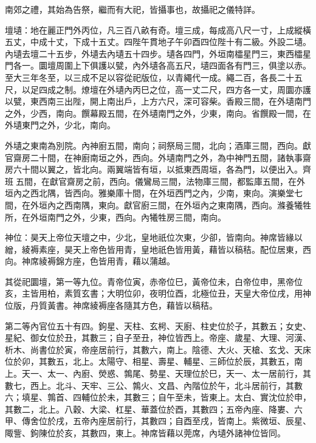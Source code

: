 \begin{pinyinscope}
 南郊之禮，其始為告祭，繼而有大祀，皆攝事也，故攝祀之儀特詳。



 壇壝：地在麗正門外丙位，凡三百八畝有奇。壇三成，每成高八尺一寸，上成縱橫五丈，中成十丈，下成十五丈。四陛午貫地子午卯酉四位陛十有二級。外設二壝。內壝去壇二十五步，外壝去內壝五十四步。壝各四門，外垣南櫺星門三，東西櫺星門各一。圜壇周圍上下俱護以甓，內外壝各高五尺，壝四面各有門三，俱塗以赤。至大三年冬至，以三成不足以容從祀版位，以青繩代一成。繩二百，各長二十五尺，以足四成之制。燎壇在外壝內丙巳之位，高一丈二尺，四方各一丈，周圜亦護以甓，東西南三出陛，開上南出戶，上方六尺，深可容柴。香殿三間，在外壝南門之外，少西，南向。饌幕殿五間，在外壝南門之外，少東，南向。省饌殿一間，在外壝東門之外，少北，南向。



 外壝之東南為別院。內神廚五間，南向；祠祭局三間，北向；酒庫三間，西向。獻官齋房二十間，在神廚南垣之外，西向。外壝南門之外，為中神門五間，諸執事齋房六十間以翼之，皆北向。兩翼端皆有垣，以抵東西周垣，各為門，以便出入。齊班五間，在獻官齋房之前，西向。儀鸞局三間，法物庫三間，都監庫五間，在外垣內之西北隅，皆西向。雅樂庫十間，在外垣西門之內，少南，東向。演樂堂七間，在外垣內之西南隅，東向。獻官廚三間，在外垣內之東南隅，西向。滌養犧牲所，在外垣南門之外，少東，西向。內犧牲房三間，南向。



 神位：昊天上帝位天壇之中，少北，皇地祇位次東，少卻，皆南向。神席皆緣以繒，綾褥素座，昊天上帝色皆用青，皇地祇色皆用黃，藉皆以稿秸。配位居東，西向。神席綾褥錦方座，色皆用青，藉以蒲越。



 其從祀圜壇，第一等九位。青帝位寅，赤帝位巳，黃帝位未，白帝位申，黑帝位亥，主皆用柏，素質玄書；大明位卯，夜明位酉，北極位丑，天皇大帝位戌，用神位版，丹質黃書。神席綾褥座各隨其方色，藉皆以稿秸。



 第二等內官位五十有四。鉤星、天柱、玄枵、天廚、柱史位於子，其數五；女史、星紀、御女位於丑，其數三；自子至丑，神位皆西上。帝座、歲星、大理、河漢、析木、尚書位於寅，帝座居前行，其數六，南上。陰德、大火、天槍、玄戈、天床位於卯，其數五，北上。太陽守、相星、壽星、輔星、三師位於辰，其數五，南上。天一、太一、內廚、熒惑、鶉尾、勢星、天理位於巳，天一、太一居前行，其數七，西上。北斗、天牢、三公、鶉火、文昌、內階位於午，北斗居前行，其數六；填星、鶉首、四輔位於未，其數三；自午至未，皆東上。太白、實沈位於申，其數二，北上。八穀、大梁、杠星、華蓋位於酉，其數四；五帝內座、降婁、六甲、傳舍位於戌，五帝內座居前行，其數四；自酉至戌，皆南上。紫微垣、辰星、陬訾、鉤陳位於亥，其數四，東上。神席皆藉以莞席，內壝外諸神位皆同。




\end{pinyinscope}
